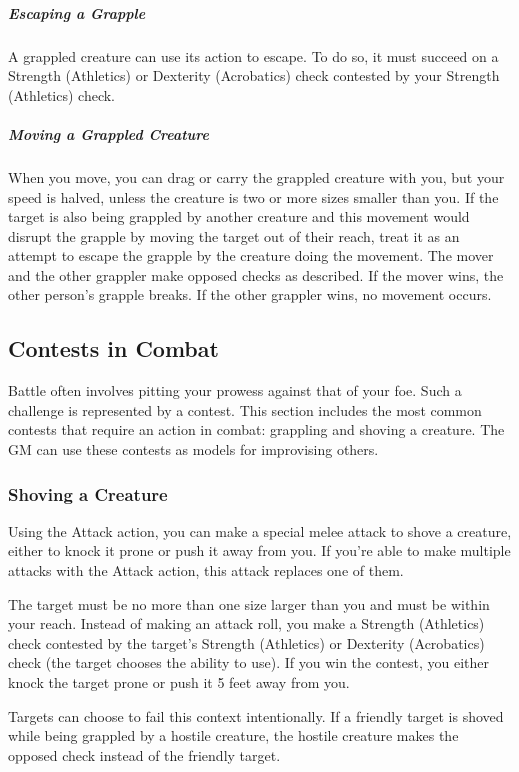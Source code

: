 \subparagraph*{Escaping a Grapple} A grappled creature can use its action to escape. To do so, it must succeed on a Strength (Athletics) or Dexterity (Acrobatics) check contested by your Strength
(Athletics) check.

\subparagraph*{Moving a Grappled Creature} When you move, you can drag or carry the grappled creature with you, but your speed is halved, unless the creature is two or more sizes smaller than you. If the target is also being grappled by another creature and this movement would disrupt the grapple by moving the target out of their reach, treat it as an attempt to escape the grapple by the creature doing the movement. The mover and the other grappler make opposed checks as described. If the mover wins, the other person's grapple breaks. If the other grappler wins, no movement occurs.

\subsection{Contests in Combat}

Battle often involves pitting your prowess against that of your foe. Such a challenge is represented by a contest. This section includes the most common contests that require an action in combat: grappling and shoving a creature. The GM can use these contests as models for improvising others.

\subsubsection{Shoving a Creature}

Using the Attack action, you can make a special melee attack to shove a creature, either to knock it prone or push it away from you. If you're able to make multiple attacks with the Attack action, this attack replaces one of them.

The target must be no more than one size larger than you and must be within your reach. Instead of making an attack roll, you make a Strength (Athletics) check contested by the target's Strength (Athletics) or Dexterity (Acrobatics) check (the target chooses the ability to use). If you win the contest, you either knock the target prone or push it 5 feet away from you.

Targets can choose to fail this context intentionally. If a friendly target is shoved while being grappled by a hostile creature, the hostile creature makes the opposed check instead of the friendly target.

